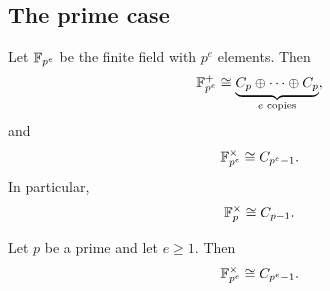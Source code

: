 \subsection{The prime case}

\begin{remark}
Let $\mathbb{F}_{p^e}$ be the finite field with $p^e$ elements. Then
\[
    \mathbb{F}_{p^e}^{+}\cong \underbrace{C_p\oplus\cdots\oplus C_p}_{e\text{ copies}},
\]
and
\[
    \mathbb{F}_{p^e}^{\times}\cong C_{p^e-1}.
\]
In particular,
\[
    \mathbb{F}_p^\times\cong C_{p-1}.
\]
\end{remark}

\begin{remark}
        Let \(p\) be a prime and let \(e\geq 1\). Then
        \[
            \mathbb{F}_{p^e}^{\times}\cong C_{p^e-1}.
        \]
    \end{remark}
        
